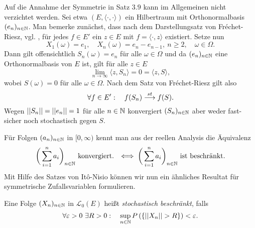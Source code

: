 \begin{remark}
    Auf die Annahme der Symmetrie in Satz $3.9$ kann im Allgemeinen nicht verzichtet werden. Sei etwa $(E, \langle\cdot,\cdot\rangle)$ ein Hilbertraum mit Orthonormalbasis $(e_n)_{n \in \mathbb{N}}$.
    Man bemerke zunächst, dass nach dem Darstellungsatz von Fréchet-Riesz, vgl. \cite[Theorem V.3.6]{werner}, für jedes $f \in E'$ ein $z \in E$ mit $f = \langle \cdot, z \rangle$ existiert. 
    Setze nun 
    $$
        X_1(\omega) = e_1, \quad X_n(\omega) = e_n - e_{n-1}, \ n \geq 2, \quad \omega \in \Omega. 
    $$
    Dann gilt offensichtlich $S_n(\omega) = e_n$ für alle $\omega \in \Omega$ und da $(e_n)_{n \in \mathbb{N}}$ eine Orthonormalbasis von $E$ ist, gilt für alle $z \in E$
    $$
        \lim_{n \to \infty}\langle z,S_n \rangle = 0 = \langle z,S \rangle,
    $$
    wobei $S(\omega) = 0$ für alle $\omega \in \Omega$. Nach dem Satz von Fréchet-Riesz gilt also 
    $$
        \forall f \in E': \quad f(S_n) \overset{st}{\longrightarrow} f(S). 
    $$
    Wegen $\lvert\lvert S_n \rvert\rvert = \lvert\lvert e_n \rvert\rvert =1$ für alle $n \in \mathbb{N}$ konvergiert $(S_n)_{n \in \mathbb{N}}$ aber weder fast-sicher noch stochastisch gegen $S$. 
    \qexampled 
\end{remark}

Für Folgen $(a_n)_{n \in \mathbb{N}}$ in $[0, \infty)$ kennt man aus der reellen Analysis die Äquivalenz
$$
    \bigg(\sum_{i=1}^n a_i\bigg)_{n \in \mathbb{N}} \text{ konvergiert. } \iff \bigg(\sum_{i=1}^n a_i\bigg)_{n \in \mathbb{N}} \text{ ist beschränkt.}
$$
Mit Hilfe des Satzes von Itô-Nisio können wir nun ein ähnliches Resultat für symmetrische Zufallsvariablen formulieren. 

\begin{mydef}
    Eine Folge $(X_n)_{n \in \mathbb{N}}$ in $\mathcal{L}_0(E)$ heißt \textit{stochastisch beschränkt}, falls
    $$
        \forall \varepsilon >0 \ \exists R > 0: \quad \sup_{n \in \mathbb{N}}P\left(\left\{ \lvert\lvert X_n \rvert\rvert > R \right\}\right) < \varepsilon. 
    $$
\end{mydef}

